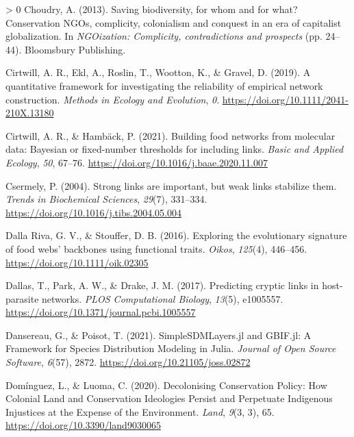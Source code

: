 \documentclass[10pt,oneside]{article}
\newlength{\cslhangindent}
\newenvironment{CSLReferences}[3] %
 {%
  \setlength{\parindent}{0pt}
  \ifodd #1 \everypar{\setlength{\hangindent}{\cslhangindent}}\ignorespaces\fi
  \ifnum #2 > 0
  \setlength{\parskip}{#2\baselineskip}
  \fi
 }%
 {}
\begin{document}
\begin{CSLReferences}{1}{0}
\leavevmode\hypertarget{ref-Choudry2013SavBio}{}%
Choudry, A. (2013). Saving biodiversity, for whom and for what?
Conservation NGOs, complicity, colonialism and conquest in an era of
capitalist globalization. In \emph{NGOization: Complicity,
contradictions and prospects} (pp. 24--44). Bloomsbury Publishing.

\leavevmode\hypertarget{ref-Cirtwill2019QuaFra}{}%
Cirtwill, A. R., Ekl, A., Roslin, T., Wootton, K., \& Gravel, D. (2019).
A quantitative framework for investigating the reliability of empirical
network construction. \emph{Methods in Ecology and Evolution}, \emph{0}.
\url{https://doi.org/10.1111/2041-210X.13180}

\leavevmode\hypertarget{ref-Cirtwill2021BuiFoo}{}%
Cirtwill, A. R., \& Hambäck, P. (2021). Building food networks from
molecular data: Bayesian or fixed-number thresholds for including links.
\emph{Basic and Applied Ecology}, \emph{50}, 67--76.
\url{https://doi.org/10.1016/j.baae.2020.11.007}

\leavevmode\hypertarget{ref-Csermely2004StrLin}{}%
Csermely, P. (2004). Strong links are important, but weak links
stabilize them. \emph{Trends in Biochemical Sciences}, \emph{29}(7),
331--334. \url{https://doi.org/10.1016/j.tibs.2004.05.004}

\leavevmode\hypertarget{ref-DallaRiva2016ExpEvo}{}%
Dalla Riva, G. V., \& Stouffer, D. B. (2016). Exploring the evolutionary
signature of food webs' backbones using functional traits. \emph{Oikos},
\emph{125}(4), 446--456. \url{https://doi.org/10.1111/oik.02305}

\leavevmode\hypertarget{ref-Dallas2017PreCry}{}%
Dallas, T., Park, A. W., \& Drake, J. M. (2017). Predicting cryptic
links in host-parasite networks. \emph{PLOS Computational Biology},
\emph{13}(5), e1005557.
\url{https://doi.org/10.1371/journal.pcbi.1005557}

\leavevmode\hypertarget{ref-Dansereau2021SimJl}{}%
Dansereau, G., \& Poisot, T. (2021). SimpleSDMLayers.jl and GBIF.jl: A
Framework for Species Distribution Modeling in Julia. \emph{Journal of
Open Source Software}, \emph{6}(57), 2872.
\url{https://doi.org/10.21105/joss.02872}

\leavevmode\hypertarget{ref-Dominguez2020DecCon}{}%
Domínguez, L., \& Luoma, C. (2020). Decolonising Conservation Policy:
How Colonial Land and Conservation Ideologies Persist and Perpetuate
Indigenous Injustices at the Expense of the Environment. \emph{Land},
\emph{9}(3, 3), 65. \url{https://doi.org/10.3390/land9030065}


\end{CSLReferences}
\end{document}
